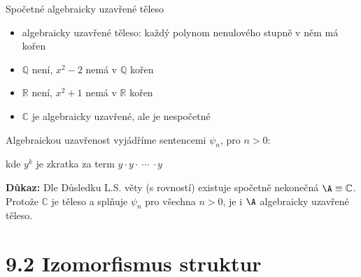 \documentclass{beamer}
\begin{document}
\begin{frame}{Spočetné algebraicky uzavřené těleso}

    \pause
    \begin{itemize}
        \item \alert{algebraicky uzavřené} těleso: každý polynom nenulového stupně v něm má kořen\pause
        \item $\mathbb Q$ není, $x^2-2$ nemá v $\mathbb Q$ kořen\pause
        \item $\mathbb R$ není, $x^2+1$ nemá v $\mathbb R$ kořen\pause
        \item $\mathbb C$ je algebraicky uzavřené, ale je nespočetné
    \end{itemize}

    \pause
    Algebraickou uzavřenost vyjádříme sentencemi $\psi_n$, pro $n>0$:
    
    \pause

    \pause
    kde $y^k$ je zkratka za term $y\cdot y \cdot\ \cdots\ \cdot y$

    \pause

    \smallskip

    \pause
    \textbf{Důkaz:}
    Dle Důsledku L.S. věty (s rovností) existuje spočetně nekonečná $\A\equiv\mathbb C$. Protože $\mathbb C$ je těleso a splňuje $\psi_n$ pro všechna $n>0$, je i $\A$ algebraicky uzavřené těleso.\hfill\qedsymbol

\end{frame}


\section{9.2 Izomorfismus struktur}
\end{document}
